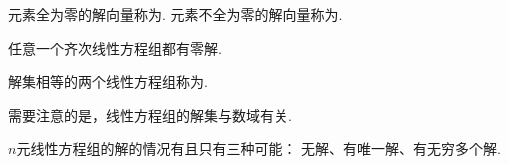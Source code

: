 \begin{definition}
元素全为零的解向量称为.
元素不全为零的解向量称为.
\end{definition}

\begin{theorem}
任意一个齐次线性方程组都有零解.
\end{theorem}

\begin{definition}
解集相等的两个线性方程组称为.
\end{definition}

需要注意的是，线性方程组的解集与数域有关.

\begin{theorem}
\(n\)元线性方程组的解的情况有且只有三种可能：
无解、有唯一解、有无穷多个解.
\end{theorem}

